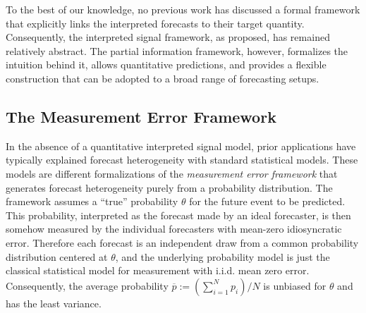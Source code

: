 \documentclass[12pt]{article}
\theoremstyle{definition}
\theoremstyle{definition}
\def\pb{\overline{p}}
\begin{document}


To the best of our knowledge, no previous work has discussed a formal framework that explicitly links the interpreted forecasts to their target quantity. Consequently, the interpreted signal framework, as proposed, has remained relatively abstract. 
The partial information framework, however, formalizes the intuition behind it, allows quantitative predictions, and provides a flexible construction that can be adopted to a broad range of forecasting setups. 

%

\subsection{The Measurement Error Framework}
\label{ss:measurement}
In the absence of a quantitative
interpreted signal model, prior applications have typically explained forecast heterogeneity  with standard statistical models. These models are different formalizations of  the \textit{measurement error framework} that generates forecast heterogeneity purely from a probability distribution. The framework assumes a ``true'' probability
$\theta$  for the future event to be predicted. This probability, interpreted as the  forecast made by an ideal forecaster, is then somehow measured by the individual forecasters with mean-zero idiosyncratic error.  Therefore each forecast is an independent draw from a common
probability distribution centered at $\theta$, and the underlying probability model is just the 
classical statistical model for measurement with i.i.d. mean zero error.  Consequently, the average probability $\pb := \left(\sum_{i=1}^N
p_i \right) / N$ is unbiased for $\theta$ and has the least
variance. 
\end{document}
